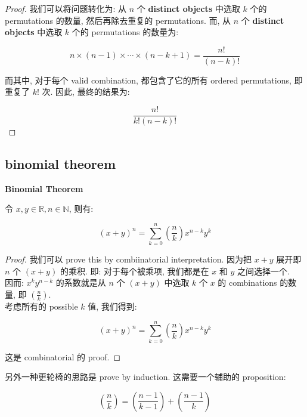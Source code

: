 \documentclass{qlnotes-export}
\begin{document}
\begin{proof}

我们可以将问题转化为: 从 \(n\) 个 \textbf{distinct objects} 中选取 \(k\) 个的 permutations 的数量, 然后再除去重复的 permutations. 而, 从 \(n\) 个 \textbf{distinct objects} 中选取 \(k\) 个的 permutations 的数量为:

\[n \times (n - 1) \times \cdots \times (n - k + 1) = \frac{n!}{(n - k)!}\]

而其中, 对于每个 valid combination, 都包含了它的所有 ordered permutations, 即重复了 \(k!\) 次. 因此, 最终的结果为:

\[\frac{n!}{k!(n - k)!}\]

\end{proof}

\subsection{binomial theorem}\label{binomial-theorem}

\begin{theorem}{\protect{}\label{kn-binomial-theorem}{\textbf{Binomial
Theorem}}}

令 \(x,y \in {\mathbb{R}},n \in {\mathbb{N}}\), 则有:

\[(x + y)^{n} = \sum\limits_{k = 0}^{n}\left( \frac{n}{k} \right)x^{n - k}y^{k}\]

\end{theorem}

\begin{proof}

我们可以 prove this by combiinatorial interpretation. 因为把 \(x + y\) 展开即 \(n\) 个 \((x + y)\) 的乘积. 即: 对于每个被乘项, 我们都是在 \(x\) 和 \(y\) 之间选择一个.\\
因而: \(x^{k}y^{n - k}\) 的系数就是从 \(n\) 个 \((x + y)\) 中选取 \(k\) 个 \(x\) 的 combinations 的数量, 即 \(\left( \frac{n}{k} \right)\).\\
考虑所有的 possible \(k\) 值, 我们得到:

\[(x + y)^{n} = \sum\limits_{k = 0}^{n}\left( \frac{n}{k} \right)x^{n - k}y^{k}\]

这是 combinatorial 的 proof.

\end{proof}

另外一种更轮椅的思路是 prove by induction. 这需要一个辅助的 proposition:

\begin{proposition}

\[\left( \frac{n}{k} \right) = \left( \frac{n - 1}{k - 1} \right) + \left( \frac{n - 1}{k} \right)\]

\end{proposition}
\end{document}
